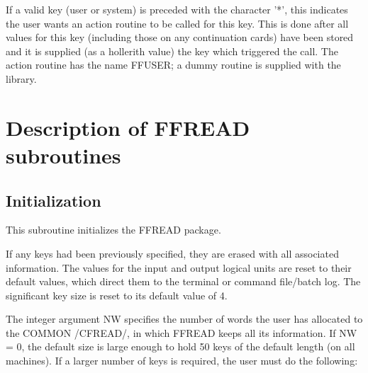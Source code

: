 If a valid key (user or system) is preceded with the character '*', this
indicates the user wants an action routine to be called for this key.
This is done after all values for this key (including those on any continuation
cards) have been stored and it is supplied (as a hollerith value) the key which
triggered the call. The action routine has the name FFUSER; a dummy routine
is supplied with the library.
 
 
\chapter{Description of FFREAD subroutines}
 
\section{Initialization}
 

This subroutine initializes the FFREAD package.
 
If any keys had been previously specified, they are erased with all
associated information.
The values for the input and output logical units are reset to their
default values, which direct them to the terminal or command file/batch log.
The significant key size is reset to its default value of 4.
 
The integer argument NW specifies the number of words the user has allocated
to the COMMON /CFREAD/, in which FFREAD keeps all its information.
If NW = 0, the default size is large enough to hold 50 keys of the default
length (on all machines). If a larger number of keys is required, the user
must do the following:
 
